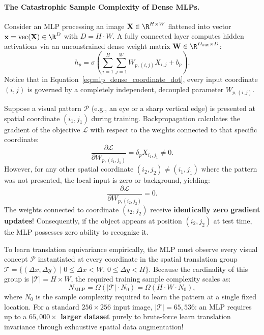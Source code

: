\paragraph{The Catastrophic Sample Complexity of Dense MLPs.}
Consider an MLP processing an image $\mathbf{X} \in \R^{H \times W}$ flattened into vector $\mathbf{x} = \operatorname{vec}(\mathbf{X}) \in \R^{D}$ with $D = H \cdot W$. A fully connected layer computes hidden activations via an unconstrained dense weight matrix $\mathbf{W} \in \R^{D_{\text{out}} \times D}$:
\begin{equation}
h_p = \sigma\left( \sum_{i=1}^H \sum_{j=1}^W W_{p, (i, j)} X_{i, j} + b_p \right).
\label{eq:mlp_dense_coordinate_dot}
\end{equation}
Notice that in Equation~\eqref{eq:mlp_dense_coordinate_dot}, every input coordinate $(i, j)$ is governed by a completely independent, decoupled parameter $W_{p, (i, j)}$.

Suppose a visual pattern $\mathcal{P}$ (e.g., an eye or a sharp vertical edge) is presented at spatial coordinate $(i_1, j_1)$ during training. Backpropagation calculates the gradient of the objective $\mathcal{L}$ with respect to the weights connected to that specific coordinate:
\begin{equation}
\frac{\partial \mathcal{L}}{\partial W_{p, (i_1, j_1)}} = \delta_p X_{i_1, j_1} \neq 0.
\end{equation}
However, for any other spatial coordinate $(i_2, j_2) \neq (i_1, j_1)$ where the pattern was not presented, the local input is zero or background, yielding:
\begin{equation}
\frac{\partial \mathcal{L}}{\partial W_{p, (i_2, j_2)}} = 0.
\end{equation}
The weights connected to coordinate $(i_2, j_2)$ receive \textbf{identically zero gradient updates}! Consequently, if the object appears at position $(i_2, j_2)$ at test time, the MLP possesses zero ability to recognize it.

To learn translation equivariance empirically, the MLP must observe every visual concept $\mathcal{P}$ instantiated at every coordinate in the spatial translation group $\mathcal{T} = \{(\Delta x, \Delta y) \mid 0 \le \Delta x < W, \, 0 \le \Delta y < H\}$. Because the cardinality of this group is $|\mathcal{T}| = H \times W$, the required training sample complexity scales as:
\begin{equation}
N_{\text{MLP}} = \Omega\left( |\mathcal{T}| \cdot N_0 \right) = \Omega\left( H \cdot W \cdot N_0 \right),
\label{eq:sample_complexity_mlp}
\end{equation}
where $N_0$ is the sample complexity required to learn the pattern at a single fixed location. For a standard $256 \times 256$ input image, $|\mathcal{T}| = 65,536$: an MLP requires up to a \textbf{$65,000\times$ larger dataset} purely to brute-force learn translation invariance through exhaustive spatial data augmentation!

